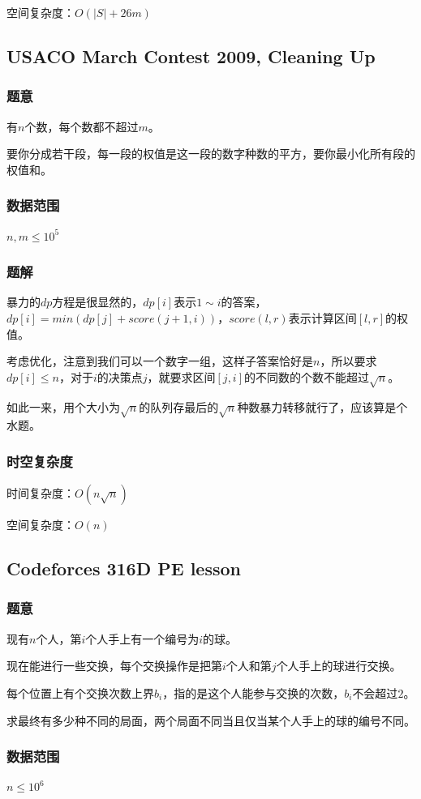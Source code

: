 \documentclass{ctexart}
\begin{document}
空间复杂度：$O(|S|+26m)$
\subsection{USACO March Contest 2009, Cleaning Up}
\subsubsection{题意}
有$n$个数，每个数都不超过$m$。

要你分成若干段，每一段的权值是这一段的数字种数的平方，要你最小化所有段的权值和。
\subsubsection{数据范围}
$n,m \le 10^5$
\subsubsection{题解}
暴力的$dp$方程是很显然的，$dp[i]$表示$1 \sim i$的答案，$dp[i]=min(dp[j]+score(j+1,i))$，$score(l,r)$表示计算区间$[l,r]$的权值。

考虑优化，注意到我们可以一个数字一组，这样子答案恰好是$n$，所以要求$dp[i] \le n$，对于$i$的决策点$j$，就要求区间$[j,i]$的不同数的个数不能超过$\sqrt{n}$。

如此一来，用个大小为$\sqrt{n}$的队列存最后的$\sqrt{n}$种数暴力转移就行了，应该算是个水题。
\subsubsection{时空复杂度}
时间复杂度：$O(n\sqrt{n})$

空间复杂度：$O(n)$
\subsection{Codeforces 316D PE lesson}
\subsubsection{题意}
现有$n$个人，第$i$个人手上有一个编号为$i$的球。

现在能进行一些交换，每个交换操作是把第$i$个人和第$j$个人手上的球进行交换。

每个位置上有个交换次数上界$b_i$，指的是这个人能参与交换的次数，$b_i$不会超过$2$。

求最终有多少种不同的局面，两个局面不同当且仅当某个人手上的球的编号不同。
\subsubsection{数据范围}
$n \le 10^6$
\end{document}

